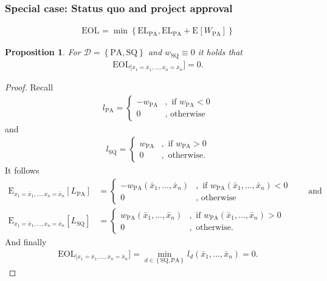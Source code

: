 \documentclass[a4paper,10pt,twoside,pagesize,abstracton]{scrartcl}
\newcommand{\E}[2][]{\mathrm{E}_{#1}\left[#2\right]} %
\newcommand{\EL}{\mathrm{EL}} %
\newcommand{\EOL}[1][]{\mathrm{EOL}_{#1}} %
\newcommand{\PA}{\mathrm{PA}} %
\newcommand{\SQ}{\mathrm{SQ}} %
\theoremstyle{plain}%
\newtheorem{prop}[thm]{Proposition}
\theoremstyle{definition}
\theoremstyle{remark}
\begin{document}
\subsubsection{Special case: Status quo and project approval}
\begin{align}
 \EOL = \min\left\{ \EL_\PA, \EL_\PA + \E{W_\PA} \right\}
\end{align}
\begin{prop}
  \label{prop:EOLUnderPerfectInformationForSQPA}
    For $\mathcal{D} = \left\{ \PA, \SQ \right\}$ and $w_\SQ \equiv 0$ it holds that
 \begin{align}
  \EOL[[x_1 =\bar{x}_1, \ldots, x_n = \bar{x}_n]] = 0.
 \end{align}
\end{prop}
\begin{proof}
Recall 
 \begin{align*}
  l_\PA = 
    \begin{cases} 
     -  w_\PA&, \textrm{~if~}  w_\PA  < 0\\
     0 &, \textrm{~otherwise}
    \end{cases}
 \end{align*}
and 
 \begin{align*}
  l_\SQ = 
    \begin{cases} 
     w_\PA&, \textrm{~if~}  w_\PA  > 0\\
     0 &, \textrm{~otherwise}.
    \end{cases}
 \end{align*}
 It follows 
\begin{align*}
   \E[x_1 =\bar{x}_1, \ldots, x_n = \bar{x}_n]{L_\PA} &=     
						    \begin{cases} 
						      -  w_\PA\left( \bar{x}_1, \ldots, \bar{x}_n \right)&, \textrm{~if~}  w_\PA\left( \bar{x}_1, \ldots, \bar{x}_n \right)  < 0\\
						      0 &, \textrm{~otherwise}
						    \end{cases} \qquad \mathrm{and}\\
   \E[x_1 =\bar{x}_1, \ldots, x_n = \bar{x}_n]{L_\SQ} &= 
						    \begin{cases} 
						      w_\PA\left( \bar{x}_1, \ldots, \bar{x}_n \right)&, \textrm{~if~}  w_\PA\left( \bar{x}_1, \ldots, \bar{x}_n \right)  > 0\\
						      0 &, \textrm{~otherwise}.
						    \end{cases}
\end{align*}
And finally
 \begin{align*}
  \EOL[[x_1 =\bar{x}_1, \ldots, x_n = \bar{x}_n]] = \min_{d\in\left\{\SQ, \PA \right\}} l_d\left( \bar{x}_1, \ldots, \bar{x}_n \right) = 0.
\end{align*}
\end{proof}
\end{document}

